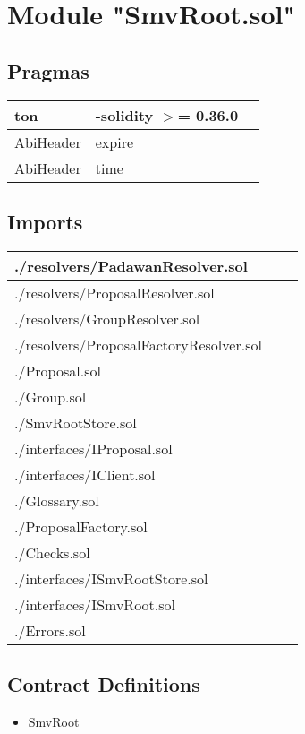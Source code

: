 
\section{Module "SmvRoot.sol"}


\subsection{Pragmas}


\noindent\begin{tabular}{|l|l|p{5cm}|}\hline
ton & -solidity $>$= 0.36.0 &\\\hline
AbiHeader &  expire &\\\hline
AbiHeader &  time &\\\hline
\end{tabular}


\subsection{Imports}


\noindent\begin{tabular}{|l|l|p{5cm}|}\hline
./resolvers/PadawanResolver.sol &\\\hline
./resolvers/ProposalResolver.sol &\\\hline
./resolvers/GroupResolver.sol &\\\hline
./resolvers/ProposalFactoryResolver.sol &\\\hline
./Proposal.sol &\\\hline
./Group.sol &\\\hline
./SmvRootStore.sol &\\\hline
./interfaces/IProposal.sol &\\\hline
./interfaces/IClient.sol &\\\hline
./Glossary.sol &\\\hline
./ProposalFactory.sol &\\\hline
./Checks.sol &\\\hline
./interfaces/ISmvRootStore.sol &\\\hline
./interfaces/ISmvRoot.sol &\\\hline
./Errors.sol &\\\hline
\end{tabular}


\subsection{Contract Definitions}

\begin{itemize}
\item SmvRoot
\end{itemize}
